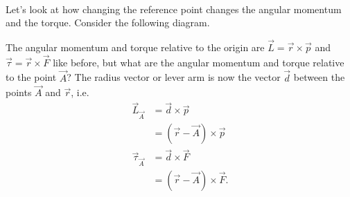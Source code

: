 \documentclass[../classical_mechanics.tex]{subfiles}
\begin{document}
        \paragraph{}
        Let's look at how changing the reference point changes the angular momentum and the torque.
        Consider the following diagram.
        \begin{figure}[H]
            \centering
        \end{figure}
        The angular momentum and torque relative to the origin are $\vec{L}=\vec{r}\times\vec{p}$ and $\vec{\tau}=\vec{r}\times\vec{F}$ like before, but what are the angular momentum and torque relative to the point $\vec{A}$?
        The radius vector or lever arm is now the vector $\vec{d}$ between the points $\vec{A}$ and $\vec{r}$, i.e.
        \begin{align}
            \vec{L}_{\vec{A}}&=\vec{d}\times\vec{p}\\
            &=(\vec{r}-\vec{A})\times\vec{p}\\
            \vec{\tau}_{\vec{A}}&=\vec{d}\times\vec{F}\\
            &=(\vec{r}-\vec{A})\times\vec{F}.
        \end{align}
\end{document}
